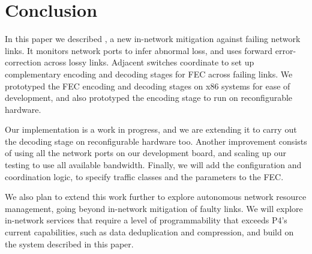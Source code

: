 \section{Conclusion}
In this paper we described \OurSys, a new in-network mitigation
against failing network links. It monitors network ports to infer
abnormal loss, and uses forward error-correction across lossy links.
Adjacent switches coordinate to set up complementary encoding and
decoding stages for FEC across failing links.  We prototyped the FEC
encoding and decoding stages on x86 systems for ease of development,
and also prototyped the encoding stage to run on reconfigurable
hardware.

Our implementation is a work in progress, and we are extending it to
carry out the decoding stage on reconfigurable hardware too.
Another improvement consists of using all the network ports on our
development board, and scaling up our testing to use all available
bandwidth.
Finally, we will add the configuration and coordination logic, to
specify traffic classes and the parameters to the FEC.

We also plan to extend this work further to explore autonomous
network resource management, going beyond in-network mitigation of
faulty links. We will explore in-network services that require
a level of programmability that exceeds P4's current capabilities,
such as data deduplication and compression, and build on the system
described in this paper.
